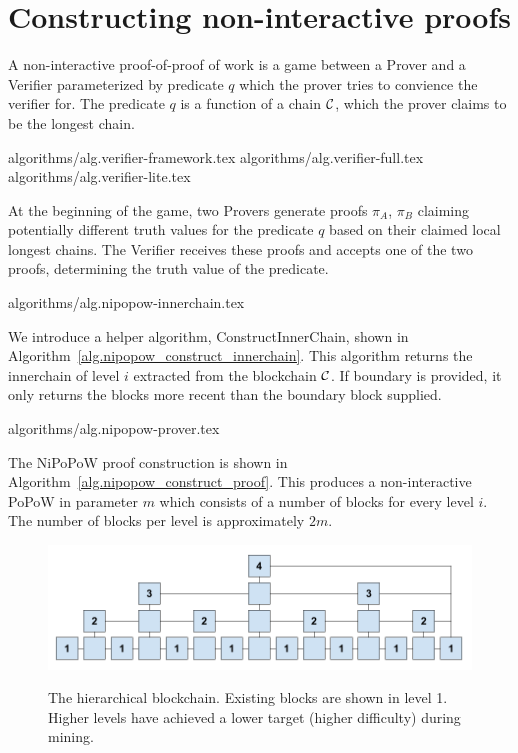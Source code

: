 \section{Constructing non-interactive proofs}

A non-interactive proof-of-proof of work is a game between a Prover and a
Verifier parameterized by predicate $q$ which the prover tries to convience the
verifier for. The predicate $q$ is a function of a chain $\mathcal{C}$, which the
prover claims to be the longest chain.

{algorithms/alg.verifier-framework.tex}
{algorithms/alg.verifier-full.tex}
{algorithms/alg.verifier-lite.tex}

At the beginning of the game, two Provers generate proofs $\pi_A$, $\pi_B$
claiming potentially different truth values for the predicate $q$ based on
their claimed local longest chains. The Verifier receives these proofs and
accepts one of the two proofs, determining the truth value of the predicate.

{algorithms/alg.nipopow-innerchain.tex}

We introduce a helper algorithm, ConstructInnerChain, shown in
Algorithm~\ref{alg.nipopow_construct_innerchain}. This algorithm returns the innerchain
of level $i$ extracted from the blockchain $\mathcal{C}$. If boundary is provided,
it only returns the blocks more recent than the boundary block supplied.

{algorithms/alg.nipopow-prover.tex}

The NiPoPoW proof construction is shown in Algorithm~\ref{alg.nipopow_construct_proof}.
This produces a non-interactive PoPoW in parameter $m$ which consists of a
number of blocks for every level $i$. The number of blocks per level is
approximately $2m$.

\begin{figure}[h]
    \caption{The hierarchical blockchain. Existing blocks are shown in level 1.
    Higher levels have achieved a lower target (higher difficulty) during mining.}
    \centering
    \includegraphics[width=\textwidth,keepaspectratio]{figures/hierarchical-ledger.png}
    \label{fig:hierarchy}
\end{figure}

